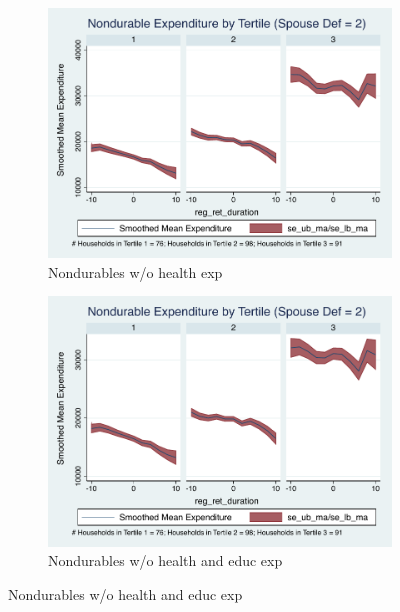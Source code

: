 \documentclass[11pt,onecolumn]{article}
\numberwithin{figure}{section}
\begin{document}
\begin{figure}
  \begin{subfigure}{0.5\textwidth}
  \centering
 	\includegraphics[width=0.9\linewidth]{../ConsumptionPostRetirement_by_SpouseDef/Smoothed_xhealth/spouse_def_2.pdf}
    \caption{Nondurables w/o health exp}
    \label{fig:chapter001_dist_001}
  \end{subfigure}
  	\hspace{1cm}
  \begin{subfigure}{0.5\textwidth}
 	\includegraphics[width=0.9\linewidth]{../ConsumptionPostRetirement_by_SpouseDef/Smoothed_xhealth_educ/spouse_def_2.pdf}
    \caption{Nondurables w/o health and educ exp}
    \label{fig:chapter001_reward_001}
  \end{subfigure}
\end{figure}
\clearpage
\end{document}
